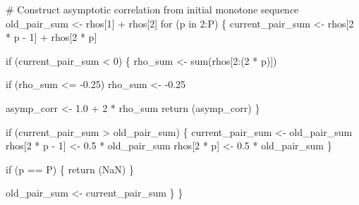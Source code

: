 \documentclass[
  letterpaper,
  DIV=11,
  numbers=noendperiod]{scrartcl}
\newenvironment{Shaded}{\begin{snugshade}}{\end{snugshade}}
\newcommand{\CommentTok}[1]{\textcolor[rgb]{0.37,0.37,0.37}{#1}}
\newcommand{\ConstantTok}[1]{\textcolor[rgb]{0.56,0.35,0.01}{#1}}
\newcommand{\ControlFlowTok}[1]{\textcolor[rgb]{0.00,0.23,0.31}{#1}}
\newcommand{\DecValTok}[1]{\textcolor[rgb]{0.68,0.00,0.00}{#1}}
\newcommand{\FloatTok}[1]{\textcolor[rgb]{0.68,0.00,0.00}{#1}}
\newcommand{\FunctionTok}[1]{\textcolor[rgb]{0.28,0.35,0.67}{#1}}
\newcommand{\NormalTok}[1]{\textcolor[rgb]{0.00,0.23,0.31}{#1}}
\newcommand{\OtherTok}[1]{\textcolor[rgb]{0.00,0.23,0.31}{#1}}
\newcommand{\SpecialCharTok}[1]{\textcolor[rgb]{0.37,0.37,0.37}{#1}}
\begin{document}
\begin{Shaded}
\begin{Highlighting}[]
  \CommentTok{\# Construct asymptotic correlation from initial monotone sequence}
\NormalTok{  old\_pair\_sum }\OtherTok{\textless{}{-}}\NormalTok{ rhos[}\DecValTok{1}\NormalTok{] }\SpecialCharTok{+}\NormalTok{ rhos[}\DecValTok{2}\NormalTok{]}
  \ControlFlowTok{for}\NormalTok{ (p }\ControlFlowTok{in} \DecValTok{2}\SpecialCharTok{:}\NormalTok{P) \{}
\NormalTok{    current\_pair\_sum }\OtherTok{\textless{}{-}}\NormalTok{ rhos[}\DecValTok{2} \SpecialCharTok{*}\NormalTok{ p }\SpecialCharTok{{-}} \DecValTok{1}\NormalTok{] }\SpecialCharTok{+}\NormalTok{ rhos[}\DecValTok{2} \SpecialCharTok{*}\NormalTok{ p]}
  
    \ControlFlowTok{if}\NormalTok{ (current\_pair\_sum }\SpecialCharTok{\textless{}} \DecValTok{0}\NormalTok{) \{}
\NormalTok{      rho\_sum }\OtherTok{\textless{}{-}} \FunctionTok{sum}\NormalTok{(rhos[}\DecValTok{2}\SpecialCharTok{:}\NormalTok{(}\DecValTok{2} \SpecialCharTok{*}\NormalTok{ p)])}
    
      \ControlFlowTok{if}\NormalTok{ (rho\_sum }\SpecialCharTok{\textless{}=} \SpecialCharTok{{-}}\FloatTok{0.25}\NormalTok{)}
\NormalTok{        rho\_sum }\OtherTok{\textless{}{-}} \SpecialCharTok{{-}}\FloatTok{0.25}
    
\NormalTok{      asymp\_corr }\OtherTok{\textless{}{-}} \FloatTok{1.0} \SpecialCharTok{+} \DecValTok{2} \SpecialCharTok{*}\NormalTok{ rho\_sum}
      \FunctionTok{return}\NormalTok{ (asymp\_corr)}
\NormalTok{    \}}
  
    \ControlFlowTok{if}\NormalTok{ (current\_pair\_sum }\SpecialCharTok{\textgreater{}}\NormalTok{ old\_pair\_sum) \{}
\NormalTok{      current\_pair\_sum }\OtherTok{\textless{}{-}}\NormalTok{ old\_pair\_sum}
\NormalTok{      rhos[}\DecValTok{2} \SpecialCharTok{*}\NormalTok{ p }\SpecialCharTok{{-}} \DecValTok{1}\NormalTok{] }\OtherTok{\textless{}{-}} \FloatTok{0.5} \SpecialCharTok{*}\NormalTok{ old\_pair\_sum}
\NormalTok{      rhos[}\DecValTok{2} \SpecialCharTok{*}\NormalTok{ p] }\OtherTok{\textless{}{-}} \FloatTok{0.5} \SpecialCharTok{*}\NormalTok{ old\_pair\_sum}
\NormalTok{    \}}
  
    \ControlFlowTok{if}\NormalTok{ (p }\SpecialCharTok{==}\NormalTok{ P) \{}
      \FunctionTok{return}\NormalTok{ (}\ConstantTok{NaN}\NormalTok{)}
\NormalTok{    \}}
  
\NormalTok{    old\_pair\_sum }\OtherTok{\textless{}{-}}\NormalTok{ current\_pair\_sum}
\NormalTok{  \}}
\NormalTok{\}}


\end{Highlighting}
\end{Shaded}
\end{document}
